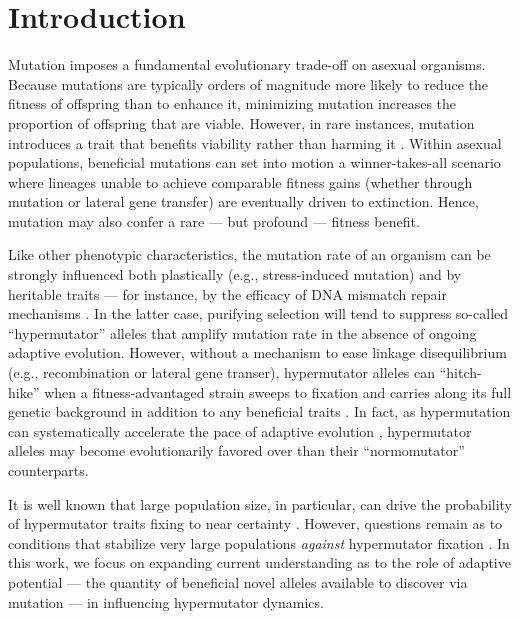 \section{Introduction} \label{sec:introduction}

Mutation imposes a fundamental evolutionary trade-off on asexual organisms.
Because mutations are typically orders of magnitude more likely to reduce the fitness of offspring than to enhance it, minimizing mutation increases the proportion of offspring that are viable.
However, in rare instances, mutation introduces a trait that benefits viability rather than harming it \citep{zeyl2004capturing,rozen2002fitness} .
Within asexual populations, beneficial mutations can set into motion a winner-takes-all scenario where lineages unable to achieve comparable fitness gains (whether through mutation or lateral gene transfer) are eventually driven to extinction.
Hence, mutation may also confer a rare --- but profound --- fitness benefit.

Like other phenotypic characteristics, the mutation rate of an organism can be strongly influenced both plastically (e.g., stress-induced mutation) \citep{ram2012evolution} and by heritable traits --- for instance, by the efficacy of DNA mismatch repair mechanisms \citep{miller1998mutators}.
In the latter case, purifying selection will tend to suppress so-called ``hypermutator'' alleles that amplify mutation rate in the absence of ongoing adaptive evolution.
However, without a mechanism to ease linkage disequilibrium (e.g., recombination or lateral gene transer), hypermutator alleles can  ``hitch-hike'' when a fitness-advantaged strain sweeps to fixation and carries along its full genetic background in addition to any beneficial traits \citep{smith1974hitchhiking,johnson1999beneficial,gentile2011competition}.
In fact, as hypermutation can systematically accelerate the pace of adaptive evolution \citep{orr2000rate}, hypermutator alleles may become evolutionarily favored over than their ``normomutator'' counterparts.

It is well known that large population size, in particular, can drive the probability of hypermutator traits fixing to near certainty \citep{raynes2018sign,tenaillon1999mutators,andre2006evolution,good2016evolution}.
However, questions remain as to conditions that stabilize very large populations \textit{against} hypermutator fixation \citep{raynes2012contrasting,raynes2019migration,tanaka2003evolution}.
In this work, we focus on expanding current understanding as to the role of adaptive potential --- the quantity of beneficial novel alleles available to discover via mutation --- in influencing hypermutator dynamics.

